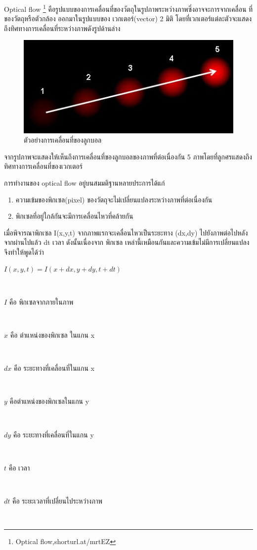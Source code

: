 Optical flow \footnote{Optical flow,shorturl.at/mrtEZ}  คือรูปแบบของการเคลื่อนที่ของวัตถุในรูปภาพระหว่างภาพซึ่งอาจจะการจากเคลื่อน ที่ของวัตถุหรือตัวกล้อง ออกมาในรูปแบบของ เวกเตอร์(vector) 2 มิติ โดยที่เวกเตอร์แต่ละตัวจะแสดงถึงทิศทางการเคลื่อนที่ระหว่างภาพดังรูปด้านล่าง

\begin{figure}[!ht]
	\centering
	\includegraphics[width=1\textwidth]{chapter2/images/vector_optical.png}
		\caption{ตัวอย่างการเคลื่อนที่ของลูกบอล}
    	\label{fig:vector_optical}
\end{figure}

จากรูปภาพจะแสดงให้เห็นถึงการเคลื่อนที่ของลูกบอลของภาพที่ต่อเนื่องกัน 5 ภาพโดยที่ลูกศรแสดงถึงทิศทางการเคลื่อนที่ของเวกเตอร์
\\
\clearpage
\par
การทำงานของ optical flow อยู่บนสมมติฐานหลายประการได้แก่
\begin{enumerate}
	\setlength\itemsep{-0.25em}
	\item ความเข้มของพิกเซล(pixel) ของวัตถุจะไม่เปลี่ยนแปลงระหว่างภาพที่ต่อเนื่องกัน
	\item พิกเซลที่อยู่ใกล้กันจะมีการเคลื่อนไหวที่คล้ายกัน
\end{enumerate}

เมื่อพิจารณาพิกเซล I(x,y,t) จากภาพแรกจะเคลื่อนไหวเป็นระยะทาง (dx,dy) ไปยังภาพต่อไปหลังจากผ่านไปแล้ว dt เวลา ดังนั้นเนื่องจาก พิกเซล เหล่านี้เหมือนกันและความเข้มไม่มีการเปลี่ยนแปลง จึงทำให้พูดได้ว่า
\\
\centerline{$I(x,y,t) = I(x + dx, y + dy, t + dt)$}		\\
\centerline{$I$ คือ พิกเซลจากภายในภาพ}			\\
\centerline{$x$ คือ ตำแหน่งของพิกเซล ในแกน x} 		\\
\centerline{$dx$ คือ ระยะทางที่เคลื่อนที่ในแกน x} 		\\
\centerline{$y$ คือตำแหน่งของพิกเซลในแกน y} 		\\
\centerline{$dy$ คือ ระยะทางที่เคลื่อนที่ในแกน y}		\\
\centerline{$t$ คือ เวลา}						\\
\centerline{$dt$ คือ ระยะเวลาที่เปลี่ยนไประหว่างภาพ} 	\\

